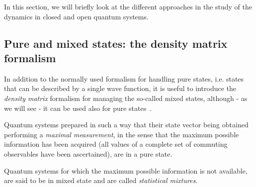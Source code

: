 In this section, we will briefly look at the different approaches in the study of the dynamics in closed and open quantum systems. 

\subsection{Pure and mixed states: the density matrix formalism}
In addition to the normally used formalism for handling pure states, i.e. states that can be described by a single wave function, it is useful to introduce the \emph{density matrix} formalism for managing the so-called mixed states, although - as we will see - it can be used also for pure states~\cite{bransden_qm}.

Quantum systems prepared in such a way that their state vector being obtained performing a \emph{maximal measurement}, in the sense that the maximum possible information has been acquired (all values of a complete set of commuting observables have been ascertained), are in a pure state. 

Quantum systems for which the maximum possible information is not available, are said to be in mixed state and are called \emph{statistical mixtures}.

